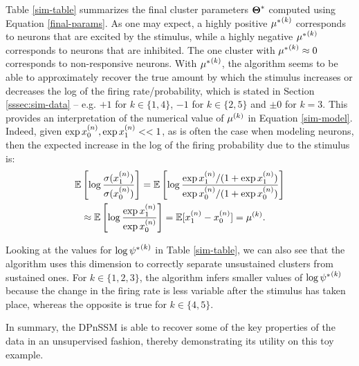 \documentclass[twoside]{article}
\begin{document}
Table \ref{sim-table} summarizes the final cluster parameters $\bd \Theta^*$ computed using Equation \ref{final-params}.  As one may expect, a highly positive $\idx {\mu^*} k$ corresponds to neurons that are excited by the stimulus, while a highly negative $\idx {\mu^*} k$ corresponds to neurons that are inhibited.  The one cluster with $\idx {\mu^*} k \approx 0$ corresponds to non-responsive neurons.  With $\idx {\mu^*} k$, the algorithm seems to be able to approximately recover the true amount by which the stimulus increases or decreases the log of the firing rate/probability, which is stated in Section \ref{sssec:sim-data} -- e.g. $+1$ for $k \in \{1, 4\}$, $-1$ for $k \in \{2, 5\}$ and $\pm 0$ for $k = 3$.  This provides an interpretation of the numerical value of $\idx \mu k$ in Equation \ref{sim-model}.  Indeed, given $\exp \idx[0] x n, \exp \idx[1] x n << 1$, as is often the case when modeling neurons, then the expected increase in the log of the firing probability due to the stimulus is: 
\begin{align}
\E & \left[\log \frac{\sigma(\idx[1] x n)}{\sigma(\idx[0] x n)}\right] = \E\left[\log \frac{\exp \idx[1] x n / (1 + \exp \idx[1] x n)}{\exp \idx[0] x n / (1 + \exp \idx[0] x n)} \right] \\
&\approx \E \left[\log \frac{\exp \idx[1] x n}{\exp \idx[0] x n} \right] = \E[\idx[1] x n - \idx[0] x n] = \idx \mu k. \nonumber
\end{align}   

Looking at the values for $\log \idx {\psi^*} k$ in Table \ref{sim-table}, we can also see that the algorithm uses this dimension to correctly separate unsustained clusters from sustained ones.  For $k \in \{1, 2, 3\}$, the algorithm infers smaller values of $\log \idx {\psi^*} k$ because the change in the firing rate is less variable after the stimulus has taken place, whereas the opposite is true for $k \in \{4, 5\}$.  

In summary, the DPnSSM is able to recover some of the key properties of the data in an unsupervised fashion, thereby demonstrating its utility on this toy example.
\end{document}
